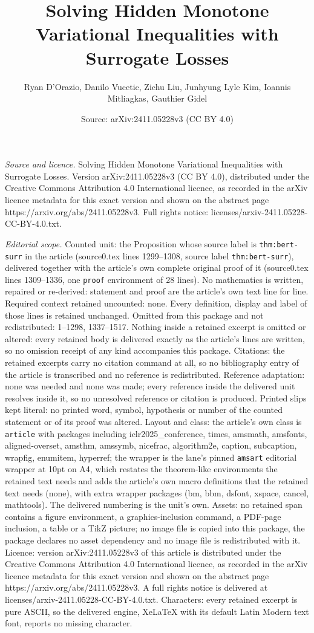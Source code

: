 \documentclass[10pt,a4paper]{amsart}
\title[Solving Hidden Monotone Variational Inequalities with Surrog]{Solving Hidden Monotone Variational Inequalities with Surrogate Losses}
\author{Ryan D'Orazio, Danilo Vucetic, Zichu Liu, Junhyung Lyle Kim, Ioannis Mitliagkas, Gauthier Gidel}
\date{Source: arXiv:2411.05228v3 (CC BY 4.0)}
\begin{document}
\maketitle

\noindent\emph{Source and licence.} Solving Hidden Monotone Variational Inequalities with Surrogate Losses. Version arXiv:2411.05228v3 (CC BY 4.0), distributed under the Creative Commons Attribution 4.0 International licence, as recorded in the arXiv licence metadata for this exact version and shown on the abstract page https://arxiv.org/abs/2411.05228v3. Full rights notice: licenses/arxiv-2411.05228-CC-BY-4.0.txt.\par\smallskip

\noindent\textit{Editorial scope.} Counted unit: the Proposition whose source label is \texttt{thm:bert-surr} in the article (source0.tex lines 1299--1308, source label \texttt{thm:bert-surr}), delivered together with the article's own complete original proof of it (source0.tex lines 1309--1336, one \texttt{proof} environment of 28 lines). No mathematics is written, repaired or re-derived: statement and proof are the article's own text line for line. Required context retained uncounted: none. Every definition, display and label of those lines is retained unchanged. Omitted from this package and not redistributed: 1--1298, 1337--1517. Nothing inside a retained excerpt is omitted or altered: every retained body is delivered exactly as the article's lines are written, so no omission receipt of any kind accompanies this package. Citations: the retained excerpts carry no citation command at all, so no bibliography entry of the article is transcribed and no reference is redistributed. Reference adaptation: none was needed and none was made; every reference inside the delivered unit resolves inside it, so no unresolved reference or citation is produced. Printed slips kept literal: no printed word, symbol, hypothesis or number of the counted statement or of its proof was altered. Layout and class: the article's own class is \texttt{article} with packages including iclr2025\_conference, times, amsmath, amsfonts, aligned-overset, amsthm, amssymb, nicefrac, algorithm2e, caption, subcaption, wrapfig, enumitem, hyperref; the wrapper is the lane's pinned \texttt{amsart} editorial wrapper at 10pt on A4, which restates the theorem-like environments the retained text needs and adds the article's own macro definitions that the retained text needs (none), with extra wrapper packages (bm, bbm, dsfont, xspace, cancel, mathtools). The delivered numbering is the unit's own. Assets: no retained span contains a figure environment, a graphics-inclusion command, a PDF-page inclusion, a table or a TikZ picture; no image file is copied into this package, the package declares no asset dependency and no image file is redistributed with it. Licence: version arXiv:2411.05228v3 of this article is distributed under the Creative Commons Attribution 4.0 International licence, as recorded in the arXiv licence metadata for this exact version and shown on the abstract page https://arxiv.org/abs/2411.05228v3. A full rights notice is delivered at licenses/arxiv-2411.05228-CC-BY-4.0.txt. Characters: every retained excerpt is pure ASCII, so the delivered engine, XeLaTeX with its default Latin Modern text font, reports no missing character.
\end{document}
